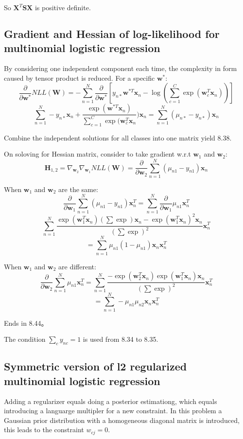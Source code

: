 \documentclass[UTF8]{ctexart}
\begin{document}
So $\textbf{X}^{T}\textbf{S}\textbf{X}$ is positive definite.

\subsection{Gradient and Hessian of log-likelihood for multinomial logistic regression}
By considering one independent component each time, the complexity in form caused by tensor product is reduced. For a specific $\textbf{w}^{*}$:
$$\frac{\partial}{\partial \textbf{w}^{*}}NLL(\textbf{W}) = -\sum_{n=1}^{N}\frac{\partial}{\partial \textbf{w}^{*}} [y_{n*}\textbf{w}^{*T}\textbf{x}_{n}-\log(\sum_{c=1}^{C}\exp(\textbf{w}_{c}^{T}\textbf{x}_{n}))]$$
$$\sum_{n=1}^{N}-y_{n*}\textbf{x}_{n}+\frac{\exp(\textbf{w}^{*T}\textbf{x}_{n})}{\sum_{c=1}^{C}\exp(\textbf{w}_{c}^{T}\textbf{x}_{n}})\textbf{x}_{n}=\sum_{n=1}^{N}(\mu_{n*}-y_{n*})\textbf{x}_{n}$$

Combine the independent solutions for all classes into one matrix yield 8.38.

On soloving for Hessian matrix, consider to take gradient w.r.t $\textbf{w}_{1}$ and $\textbf{w}_{2}$:
$$\textbf{H}_{1,2}=\nabla_{\textbf{w}_{2}}\nabla_{\textbf{w}_{1}}NLL(\textbf{W})=\frac{\partial}{\partial \textbf{w}_{2}} \sum_{n=1}^{N}(\mu_{n1}-y_{n1})\textbf{x}_{n}  $$

When $\textbf{w}_{1}$ and $\textbf{w}_{2}$ are the same:
$$\frac{\partial}{\partial \textbf{w}_{1}} \sum_{n=1}^{N}(\mu_{n1}-y_{n1})\textbf{x}_{n}^{T}=\sum_{n=1}^{N}\frac{\partial}{\partial \textbf{w}_{1}}\mu_{n1}\textbf{x}_{n}^{T}$$
$$\sum_{n=1}^{N}\frac{\exp(\textbf{w}_{1}^{T}\textbf{x}_{n})(\sum \exp)\textbf{x}_{n}-\exp(\textbf{w}_{1}^{T}\textbf{x}_{n})^{2}\textbf{x}_{n}}{(\sum \exp)^{2}}\textbf{x}_{n}^{T}$$
$$=\sum_{n=1}^{N}\mu_{n1}(1-\mu_{n1})\textbf{x}_{n}\textbf{x}_{n}^{T}$$

When $\textbf{w}_{1}$ and $\textbf{w}_{2}$ are different:
$$\frac{\partial}{\partial \textbf{w}_{2}} \sum_{n=1}^{N}\mu_{n1}\textbf{x}_{n}^{T}=\sum_{n=1}^{N}\frac{-\exp(\textbf{w}_{2}^{T}\textbf{x}_{n})\exp(\textbf{w}_{1}^{T}\textbf{x}_{n})\textbf{x}_{n}}{(\sum\exp)^{2}}\textbf{x}_{n}^{T}$$
$$=\sum_{n=1}^{N}-\mu_{n1}\mu_{n2}\textbf{x}_{n}\textbf{x}_{n}^{T}$$

Ends in 8.44。

The condition $\sum_{c}y_{nc}=1$ is used from 8.34 to 8.35.

\subsection{Symmetric version of l2 regularized multinomial logistic regression}
Adding a regularizer equals doing a posterior estimationg, which equals introducing a languarge multipler for a new constraint. In this problem a Gaussian prior distribution with a homogeneous diagonal matrix is introduced, this leads to the constraint $w_{cj}=0$.
\end{document}
